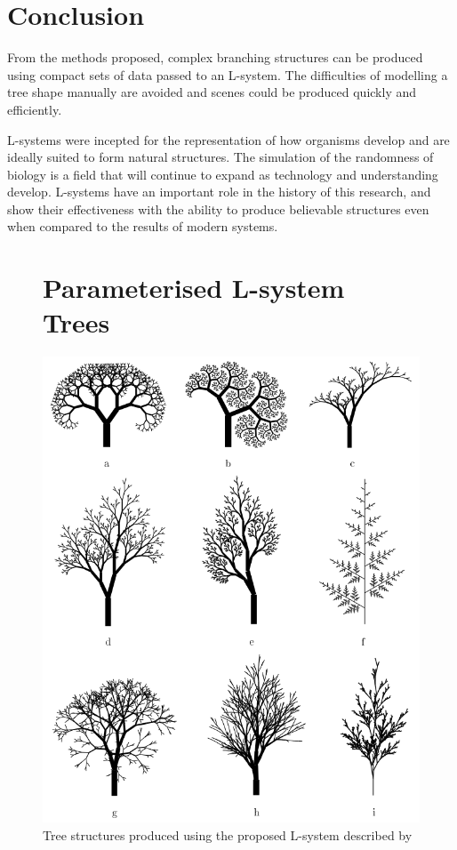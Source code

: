 \documentclass[final]{cmpreport}
\begin{document}
\section{Conclusion}
From the methods proposed, complex branching structures can be produced using compact sets of data 
passed to an L-system. The difficulties of modelling a tree shape manually are avoided and scenes 
could be produced quickly and efficiently.

L-systems were incepted for the representation of how organisms develop and are ideally suited to 
form natural structures. The simulation of the randomness of biology is a field that will continue 
to expand as technology and understanding develop. L-systems have an important role in the history 
of this research, and show their effectiveness with the ability to produce believable structures 
even when compared to the results of modern systems. 

\pagebreak


\appendix{}
\begin{figure}[ht]
    \section{Parameterised L-system Trees}
    \label{app:parameterised-lsystem-trees}
    \includegraphics[scale=0.7]{tree-lsystem-results.PNG} 
    \centering
    \captionsetup{justification=centering}
    \caption{Tree structures produced using the proposed L-system described by \cite{prusinkiewicz1996systems}}
    \label{fig:tree-lsystem-results}
\end{figure}
\end{document}
